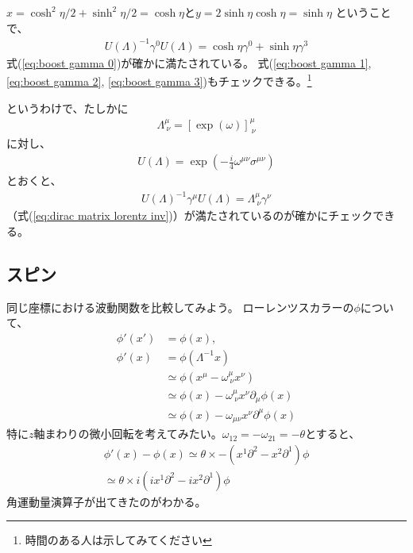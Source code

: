 \documentclass[10pt,a4paper]{jarticle}
\begin{document}
$x = \cosh^2\eta / 2 + \sinh^2 \eta/2 = \cosh\eta$と$y = 2\sinh\eta\cosh\eta = \sinh\eta$
ということで、
\begin{align}
U(\Lambda)^{-1} \gamma^0 U(\Lambda) = \cosh\eta \gamma^0 + \sinh\eta \gamma^3
\end{align}
式(\ref{eq:boost gamma 0})が確かに満たされている。
式(\ref{eq:boost gamma 1}, \ref{eq:boost gamma 2}, \ref{eq:boost gamma 3})もチェックできる。\footnote{時間のある人は示してみてください}

というわけで、たしかに
\begin{align}
\Lambda^\mu_{~\nu} = [\exp(\omega)]^\mu_{~\nu}
\end{align}
に対し、
\begin{align}
U(\Lambda) = \exp\left( -\frac{i}{4} \omega^{\mu\nu} \sigma^{\mu\nu} \right)
\end{align}
とおくと、
\begin{align}
U(\Lambda)^{-1} \gamma^\mu U(\Lambda) = \Lambda^\mu_{~\nu} \gamma^\nu
\end{align}
（式(\ref{eq:dirac matrix lorentz inv})）が満たされているのが確かにチェックできる。


\subsection{スピン}\label{sec:spin}
同じ座標における波動関数を比較してみよう。
ローレンツスカラーの$\phi$について、
\begin{align}
\phi'(x') &= \phi(x),\\
\phi'(x) &= \phi(\Lambda^{-1} x) \nonumber\\
& \simeq \phi(x^\mu - \omega^{\mu}_{~\nu} x^\nu) \nonumber\\
& \simeq \phi(x) - \omega^{\mu}_{~\nu} x^\nu \partial_\mu \phi(x)  \nonumber\\
& \simeq \phi(x) - \omega_{\mu\nu} x^\nu \partial^\mu \phi(x)
\end{align}
%
特に$z$軸まわりの微小回転を考えてみたい。$\omega_{12} = -\omega_{21} = -\theta$とすると、
\begin{align}
\phi'(x) - \phi(x)
\simeq \theta \times -(x^1 \partial^2 - x^2 \partial^1) \phi \nonumber\\
\simeq \theta \times i( ix^1 \partial^2 - ix^2 \partial^1) \phi
\end{align}
角運動量演算子が出てきたのがわかる。
\end{document}
